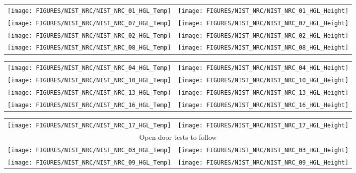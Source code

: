 \begin{figure}[p]
\begin{tabular*}{\textwidth}{l@{\extracolsep{\fill}}r}
\texttt{[image: FIGURES/NIST\_NRC/NIST\_NRC\_01\_HGL\_Temp]} &
\texttt{[image: FIGURES/NIST\_NRC/NIST\_NRC\_01\_HGL\_Height]} \\
\texttt{[image: FIGURES/NIST\_NRC/NIST\_NRC\_07\_HGL\_Temp]} &
\texttt{[image: FIGURES/NIST\_NRC/NIST\_NRC\_07\_HGL\_Height]} \\
\texttt{[image: FIGURES/NIST\_NRC/NIST\_NRC\_02\_HGL\_Temp]} &
\texttt{[image: FIGURES/NIST\_NRC/NIST\_NRC\_02\_HGL\_Height]} \\
\texttt{[image: FIGURES/NIST\_NRC/NIST\_NRC\_08\_HGL\_Temp]} &
\texttt{[image: FIGURES/NIST\_NRC/NIST\_NRC\_08\_HGL\_Height]}
\end{tabular*}
\end{figure}

\begin{figure}[p]
\begin{tabular*}{\textwidth}{l@{\extracolsep{\fill}}r}
\texttt{[image: FIGURES/NIST\_NRC/NIST\_NRC\_04\_HGL\_Temp]} &
\texttt{[image: FIGURES/NIST\_NRC/NIST\_NRC\_04\_HGL\_Height]} \\
\texttt{[image: FIGURES/NIST\_NRC/NIST\_NRC\_10\_HGL\_Temp]} &
\texttt{[image: FIGURES/NIST\_NRC/NIST\_NRC\_10\_HGL\_Height]} \\
\texttt{[image: FIGURES/NIST\_NRC/NIST\_NRC\_13\_HGL\_Temp]} &
\texttt{[image: FIGURES/NIST\_NRC/NIST\_NRC\_13\_HGL\_Height]} \\
\texttt{[image: FIGURES/NIST\_NRC/NIST\_NRC\_16\_HGL\_Temp]} &
\texttt{[image: FIGURES/NIST\_NRC/NIST\_NRC\_16\_HGL\_Height]}
\end{tabular*}
\end{figure}

\begin{figure}[p]
\begin{tabular*}{\textwidth}{l@{\extracolsep{\fill}}r}
\texttt{[image: FIGURES/NIST\_NRC/NIST\_NRC\_17\_HGL\_Temp]} &
\texttt{[image: FIGURES/NIST\_NRC/NIST\_NRC\_17\_HGL\_Height]} \\ [1.in]
\multicolumn{2}{c}{Open door tests to follow} \\ [1.in]
\texttt{[image: FIGURES/NIST\_NRC/NIST\_NRC\_03\_HGL\_Temp]} &
\texttt{[image: FIGURES/NIST\_NRC/NIST\_NRC\_03\_HGL\_Height]} \\
\texttt{[image: FIGURES/NIST\_NRC/NIST\_NRC\_09\_HGL\_Temp]} &
\texttt{[image: FIGURES/NIST\_NRC/NIST\_NRC\_09\_HGL\_Height]}
\end{tabular*}
\end{figure}

